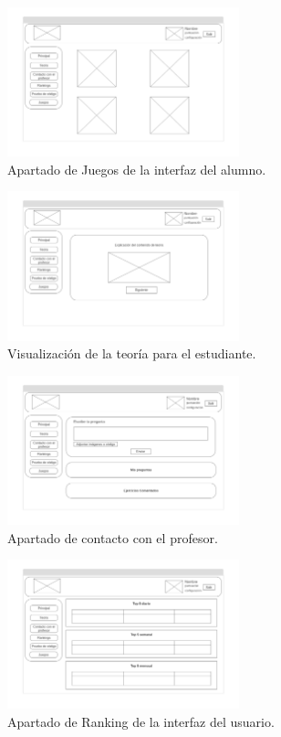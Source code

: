 \begin{figure}[H]
    \centering
    \includegraphics[width=0.6\textwidth]{imagenes/Mockups/4-Juegos.png}
    \caption{Apartado de Juegos de la interfaz del alumno.}
\end{figure}

\begin{figure}[H]
    \centering
    \includegraphics[width=0.6\textwidth]{imagenes/Mockups/5-Teoria.png}
    \caption{Visualización de la teoría para el estudiante.}
\end{figure}

\begin{figure}[H]
    \centering
    \includegraphics[width=0.6\textwidth]{imagenes/Mockups/6-Consulta.png}
    \caption{Apartado de contacto con el profesor.}
\end{figure}

\begin{figure}[H]
    \centering
    \includegraphics[width=0.6\textwidth]{imagenes/Mockups/7-Ranking.png}
    \caption{Apartado de Ranking de la interfaz del usuario.}
\end{figure}


